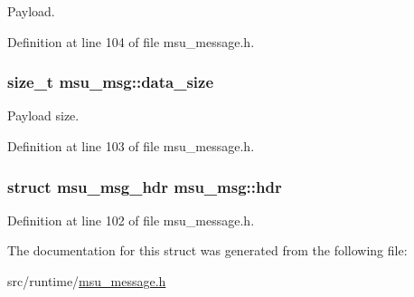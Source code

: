 Payload. 



Definition at line 104 of file msu\-\_\-message.\-h.

\hypertarget{structmsu__msg_ad6dbac0bebca6dacb6cc2b1157d114ba}{
\subsubsection[{data\-\_\-size}]{\setlength{\rightskip}{0pt plus 5cm}size\-\_\-t msu\-\_\-msg\-::data\-\_\-size}}\label{structmsu__msg_ad6dbac0bebca6dacb6cc2b1157d114ba}


Payload size. 



Definition at line 103 of file msu\-\_\-message.\-h.

\hypertarget{structmsu__msg_a3c0177321a542571240821c2350ba424}{
\subsubsection[{hdr}]{\setlength{\rightskip}{0pt plus 5cm}struct {\bf msu\-\_\-msg\-\_\-hdr} msu\-\_\-msg\-::hdr}}\label{structmsu__msg_a3c0177321a542571240821c2350ba424}


Definition at line 102 of file msu\-\_\-message.\-h.



The documentation for this struct was generated from the following file\-:\begin{DoxyCompactItemize}
\item 
src/runtime/\hyperlink{msu__message_8h}{msu\-\_\-message.\-h}\end{DoxyCompactItemize}
